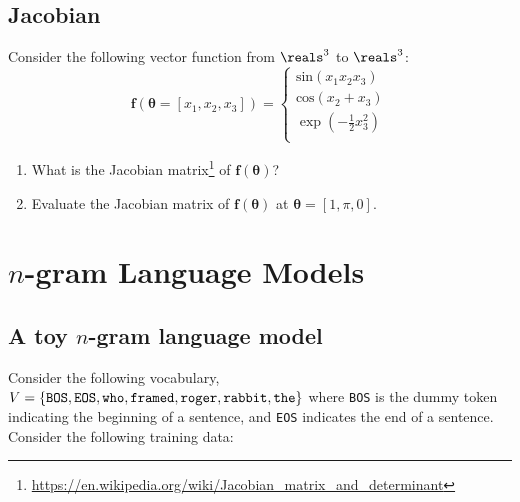 \subsection{Jacobian}
Consider the following vector function from $\reals^3$ to $\reals^3$: 
$$
    \mathbf{f}(\boldsymbol{\theta} = [x_1, x_2, x_3]) = 
    \begin{cases}
        \text{sin}(x_1x_2x_3) \\
        \text{cos}(x_2 + x_3) \\
        \exp(-\frac{1}{2}x_3^2) \\
    \end{cases}
$$

\begin{enumerate}
    \item What is the Jacobian matrix\footnote{\url{https://en.wikipedia.org/wiki/Jacobian_matrix_and_determinant}} of $\mathbf{f}(\boldsymbol{\theta})$?\\
    \solution{\[
J_{\mathbf{f}}(\boldsymbol{\theta}) =
\begin{bmatrix}
x_2 x_3 \cos(x_1 x_2 x_3) & x_1 x_3 \cos(x_1 x_2 x_3) & x_1 x_2 \cos(x_1 x_2 x_3) \\
0 & -\sin(x_2 + x_3) & -\sin(x_2 + x_3) \\
0 & 0 & -x_3 e^{-\frac{1}{2}x_3^2}
\end{bmatrix}
\]}
    
    \item Evaluate the Jacobian matrix of $\mathbf{f}(\boldsymbol{\theta})$ at 
    $\boldsymbol{\theta} = [1, \pi, 0]$.\\
    \solution{\[
J_{\mathbf{f}}(1, \pi, 0) =
\begin{bmatrix}
0 & 0 & \pi \\
0 & 0 & 0 \\
0 & 0 & 0
\end{bmatrix}
\]}
\end{enumerate}

\clearpage


\section{$n$-gram Language Models}
\subsection{A toy $n$-gram language model}

Consider the following vocabulary, $V= \{\tt BOS, EOS, who, framed, roger, rabbit, the\}$ where \texttt{BOS} is the dummy token indicating the beginning of a sentence, and \texttt{EOS} indicates the end of a sentence. Consider the following training data:


